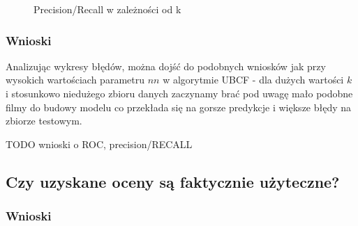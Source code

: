 \documentclass[12pt, a4paper]{article}
\begin{document}
\begin{figure}[H]
  \begin{center}
  \end{center}
  \caption{Precision/Recall w zależności od k}
  \label{fig:ubcf-nn-rmse}
\end{figure}



\subsubsection{Wnioski}
Analizując wykresy błędów, można dojść do podobnych wniosków jak przy wysokich wartościach parametru $nn$ w algorytmie UBCF - dla dużych wartości $k$ i stosunkowo niedużego zbioru danych zaczynamy brać pod uwagę mało podobne filmy do budowy modelu co przekłada się na gorsze predykcje i większe błędy na zbiorze testowym.

TODO wnioski o ROC, precision/RECALL

\subsection{Czy uzyskane oceny są faktycznie użyteczne?}

\subsubsection{Wnioski}
\end{document}
